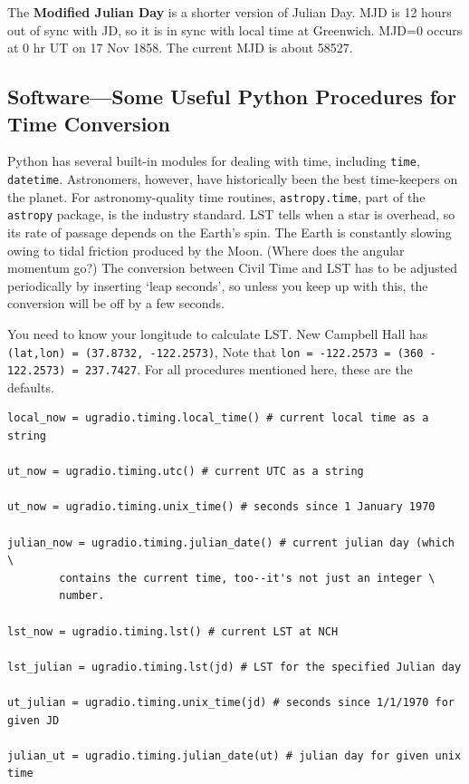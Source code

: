 \documentclass[12pt,preprint]{aastex}
\begin{document}
The {\bf Modified Julian Day} is a shorter version of Julian Day. MJD is 12
hours out of sync with JD, so it is in sync with local time at
Greenwich. MJD=0 occurs at 0 hr UT on 17 Nov 1858.  The current MJD is
about 58527. %

\subsection{ Software---Some Useful Python Procedures for Time Conversion}

Python has several built-in modules for dealing with time, including {\tt time}, {\tt datetime}.
Astronomers, however, have historically been the best time-keepers on the planet.  For
astronomy-quality time routines, {\tt astropy.time}, part of the {\tt astropy} package, is
the industry standard.
LST tells when a star
is overhead, so its rate of passage depends on the Earth's spin. The
Earth is constantly slowing owing to tidal friction produced by the
Moon. (Where does the angular momentum go?) The conversion between Civil Time and LST has to be adjusted
periodically by inserting `leap seconds', so unless you keep up with
this, the conversion will be off by a few seconds. 

You need to know your
longitude to calculate LST. New Campbell Hall has \\
{\tt (lat,lon) = (37.8732, -122.2573)},  Note that {\tt lon = -122.2573 = (360 - 122.2573) = 237.7427}. 
For all procedures mentioned here, these are the defaults.

\begin{verbatim}
local_now = ugradio.timing.local_time() # current local time as a string

ut_now = ugradio.timing.utc() # current UTC as a string

ut_now = ugradio.timing.unix_time() # seconds since 1 January 1970

julian_now = ugradio.timing.julian_date() # current julian day (which \
        contains the current time, too--it's not just an integer \
        number. 
                                                                               
lst_now = ugradio.timing.lst() # current LST at NCH
                                                                               
lst_julian = ugradio.timing.lst(jd) # LST for the specified Julian day                                                             
                                                                               
ut_julian = ugradio.timing.unix_time(jd) # seconds since 1/1/1970 for given JD
                                                                               
julian_ut = ugradio.timing.julian_date(ut) # julian day for given unix time
\end{verbatim}
\end{document}
